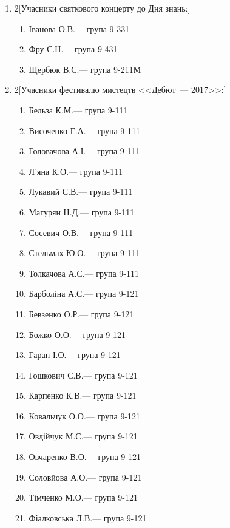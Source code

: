 \documentclass[
	a4paper,
	12pt,
	oneside,
	draft
]{extreport}
\begin{document}
{\begin{enumerate}[label=\Roman*.]
\item \begin{multicols}{2}[Учасники святкового концерту до Дня знань:]
\begin{enumerate}[topsep=0pt,itemsep=-1ex,partopsep=1ex,parsep=1ex,label=\arabic*.]
\item Іванова О.В.\hfill --- група 9-331
\item Фру С.Н.\hfill --- група 9-431
\item Щербюк В.С.\hfill --- група 9-211М
\end{enumerate}
\end{multicols}


\item \begin{multicols}{2}[Учасники фестивалю мистецтв <<Дебют~--- 2017>>:]
\begin{enumerate}[topsep=0pt,itemsep=-1ex,partopsep=1ex,parsep=1ex,label=\arabic*.]
\item Бельза К.М.\hfill --- група 9-111
\item Височенко Г.А.\hfill --- група 9-111
\item Головачова А.І.\hfill --- група 9-111
\item Л’яна К.О.\hfill --- група 9-111
\item Лукавий С.В.\hfill --- група 9-111
\item Магурян Н.Д.\hfill --- група 9-111
\item Сосевич О.В.\hfill --- група 9-111
\item Стельмах Ю.О.\hfill --- група 9-111
\item Толкачова А.С.\hfill --- група 9-111
\item Барболіна А.С.\hfill --- група 9-121
\item Бевзенко О.Р.\hfill --- група 9-121
\item Божко О.О.\hfill --- група 9-121
\item Гаран І.О.\hfill --- група 9-121
\item Гошкович С.В.\hfill --- група 9-121
\item Карпенко К.В.\hfill --- група 9-121
\item Ковальчук О.О.\hfill --- група 9-121
\item Овдійчук М.С.\hfill --- група 9-121
\item Овчаренко В.О.\hfill --- група 9-121
\item Соловйова А.О.\hfill --- група 9-121
\item Тімченко М.О.\hfill --- група 9-121
\item Фіалковська Л.В.\hfill --- група 9-121

\end{enumerate}
\end{multicols}
\end{enumerate}}
\end{document}
